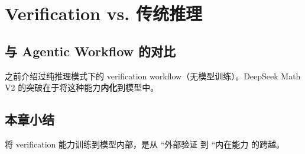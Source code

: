 \section{Verification vs. 传统推理}
\subsection{与 Agentic Workflow 的对比}
之前介绍过纯推理模式下的 verification workflow（无模型训练）。DeepSeek Math V2 的突破在于将这种能力\textbf{内化}到模型中。

\subsection{本章小结}
将 verification 能力训练到模型内部，是从 ``外部验证 到 ``内在能力 的跨越。

\newpage
